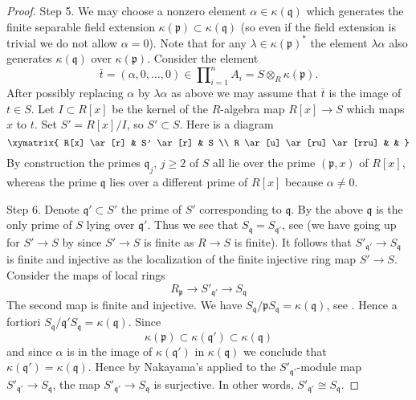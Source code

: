 \begin{proof}
\medskip\noindent
Step 5. We may choose a nonzero element $\alpha \in \kappa(\mathfrak q)$ which
generates the finite separable field extension
$\kappa(\mathfrak p) \subset \kappa(\mathfrak q)$ (so even if the
field extension is trivial we do not allow $\alpha = 0$).
Note that for any $\lambda \in \kappa(\mathfrak p)^*$ the
element $\lambda \alpha$ also generates $\kappa(\mathfrak q)$
over $\kappa(\mathfrak p)$. Consider the element
$$
\overline{t} =
(\alpha, 0, \ldots, 0) \in
\prod\nolimits_{i = 1}^n A_i =
S \otimes_R \kappa(\mathfrak p).
$$
After possibly replacing $\alpha$ by $\lambda \alpha$ as above
we may assume that $\overline{t}$ is the image of $t \in S$.
Let $I \subset R[x]$ be the kernel of the $R$-algebra
map $R[x] \to S$ which maps $x$ to $t$. Set $S' = R[x]/I$,
so $S' \subset S$. Here is a diagram
$$
\xymatrix{
R[x] \ar[r] & S' \ar[r] & S \\
R \ar[u] \ar[ru] \ar[rru] & &
}
$$
By construction the primes $\mathfrak q_j$, $j \geq 2$ of $S$ all
lie over the prime $(\mathfrak p, x)$ of $R[x]$, whereas
the prime $\mathfrak q$ lies over a different prime of $R[x]$
because $\alpha \not = 0$.

\medskip\noindent
Step 6. Denote $\mathfrak q' \subset S'$ the prime of $S'$
corresponding to $\mathfrak q$. By the above $\mathfrak q$ is
the only prime of $S$ lying over $\mathfrak q'$. Thus we see that
$S_{\mathfrak q} = S_{\mathfrak q'}$, see
 (we have
going up for $S' \to S$ by 
since $S' \to S$ is finite as $R \to S$ is finite).
It follows that $S'_{\mathfrak q'} \to S_{\mathfrak q}$ is finite
and injective as the localization of the finite injective ring map
$S' \to S$. Consider the maps of local rings
$$
R_{\mathfrak p} \to S'_{\mathfrak q'} \to S_{\mathfrak q}
$$
The second map is finite and injective. We have
$S_{\mathfrak q}/\mathfrak pS_{\mathfrak q} = \kappa(\mathfrak q)$,
see .
Hence a fortiori
$S_{\mathfrak q}/\mathfrak q'S_{\mathfrak q} = \kappa(\mathfrak q)$.
Since
$$
\kappa(\mathfrak p) \subset \kappa(\mathfrak q') \subset \kappa(\mathfrak q)
$$
and since $\alpha$ is in the image of $\kappa(\mathfrak q')$ in
$\kappa(\mathfrak q)$
we conclude that $\kappa(\mathfrak q') = \kappa(\mathfrak q)$.
Hence by Nakayama's  applied to the
$S'_{\mathfrak q'}$-module map $S'_{\mathfrak q'} \to S_{\mathfrak q}$,
the map $S'_{\mathfrak q'} \to S_{\mathfrak q}$ is surjective.
In other words,
$S'_{\mathfrak q'} \cong S_{\mathfrak q}$.


\end{proof}
